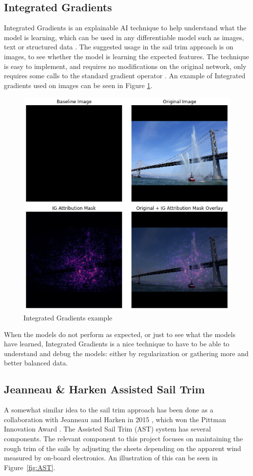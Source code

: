 \subsection{Integrated Gradients} \label{LR:IG}
Integrated Gradients is an explainable AI technique to help understand what the model is learning, which can be used in any differentiable model such as images, text or structured data \cite{TF:IG}. The suggested usage in the sail trim approach is on images, to see whether the model is learning the expected features. The technique is easy to implement, and requires no modifications on the original network, only requires some calls to the standard gradient operator \cite{IGpaper}. An example of Integrated gradients used on images can be seen in Figure \ref{fig:IG}. 

\begin{figure}[h]
\centering
\includegraphics[width = 0.7\hsize]{figures/IG_fireboat.png}
\caption{Integrated Gradients example \cite{TF:IG}}
\label{fig:IG}
\end{figure}

When the models do not perform as expected, or just to see what the models have learned, Integrated Gradients is a nice technique to have to be able to understand and debug the models: either by regularization or gathering more and better balanced data.

\subsection{Jeanneau \& Harken Assisted Sail Trim} \label{LR:AST}
A somewhat similar idea to the sail trim approach has been done as a collaboration with Jeanneau and Harken in 2015 \cite{harkenAST}, which won the Pittman Innovation Award \cite{pittman_awards}.
The Assisted Sail Trim (AST) system has several components. The relevant component to this project focuses on maintaining the rough trim of the sails by adjusting the sheets depending on the apparent wind measured by on-board electronics. An illustration of this can be seen in Figure~\ref{fig:AST}.

